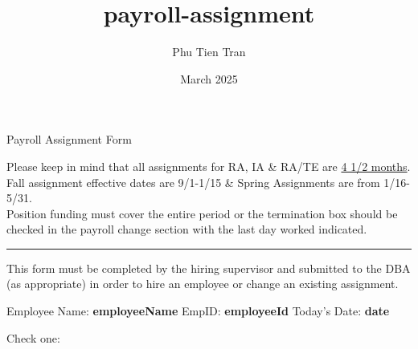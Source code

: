 \documentclass{article}
\title{payroll-assignment}
\author{Phu Tien Tran}
\date{March 2025}
\begin{document}
\thispagestyle{empty}

\begin{center}
    \LARGE
    Payroll Assignment Form\vspace{-0.2cm}
\end{center}

\begin{center}
    \color{Bittersweet}
    \scriptsize
    \rmfamily
    Please keep in mind that all assignments for RA, IA \& RA/TE are \underline {4 1/2 months}. Fall assignment effective dates are 9/1-1/15 \& Spring Assignments are from 1/16-5/31. \\    
    Position funding must cover the entire period or the termination box should be checked in the payroll change section with the last day worked indicated.
    \color{black}\par\rule{\textwidth}{0.1pt}
    \vspace{-0.6cm}

    \color{blue}\normalsize\centering
    This form must be completed by the hiring supervisor and submitted to the DBA (as appropriate) in order to hire an employee or change an existing assignment.

\end{center}
\vspace{-0.6cm}
\begin{tcolorbox}[standard jigsaw, opacityback=0]
    \begin{Form}
        Employee Name: \textbf{ {{employeeName}} } 
        \hspace{0.3cm} EmpID: \textbf{ {{employeeId}} }
        \hspace{0.3cm} Today's Date: \textbf{ {{date}} }

        \vspace{0.2cm}
        {Check one:}

        \hspace{2cm}
    \end{Form}
\end{tcolorbox}
\end{document}
